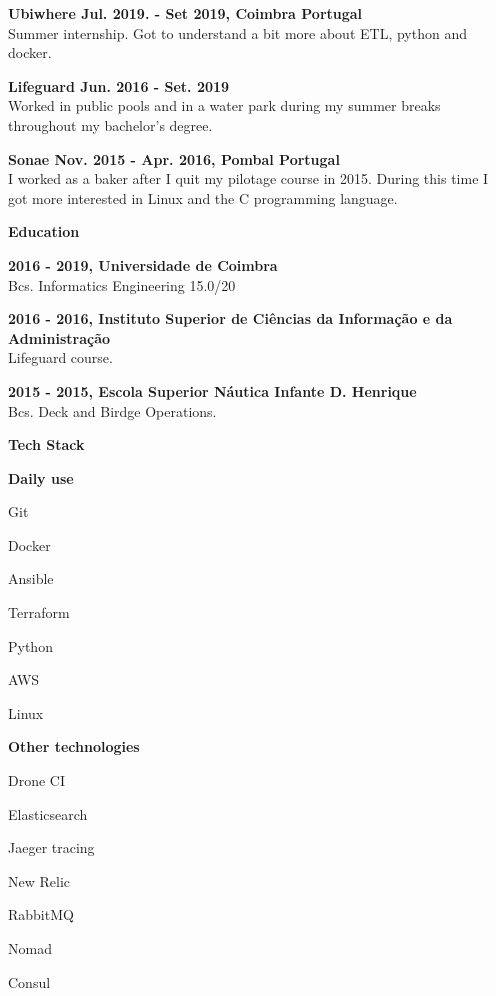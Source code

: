\documentclass[a4paper,12pt,final]{memoir}
\newcommand{\Sep}{\vspace{1.5em}}
\newcommand{\SmallSep}{\vspace{0.5em}}
\newcommand{\CVSection}[1]
	{\Large\textbf{#1}\par
	\SmallSep\normalsize\normalfont}
\newcommand{\CVItem}[1]
	{\textbf{\color{RoyalBlue} #1}}
\begin{document}
\CVItem{Ubiwhere Jul. 2019. - Set 2019, Coimbra Portugal}\\
Summer internship. Got to understand a bit more about ETL, python and docker. 
\SmallSep

\CVItem{Lifeguard Jun. 2016 - Set. 2019}\\
Worked in public pools and in a water park during my summer breaks throughout my bachelor's degree.
\SmallSep

\CVItem{Sonae Nov. 2015 - Apr. 2016, Pombal Portugal}\\
I worked as a baker after I quit my pilotage course in 2015. During this time I got more interested in Linux and the C programming language.
\SmallSep


\Sep

\CVSection{Education}
\CVItem{2016 - 2019, Universidade de Coimbra}\\
Bcs. Informatics Engineering 15.0/20
\SmallSep

\CVItem{2016 - 2016, Instituto Superior de Ciências da Informação e da Administração}\\
Lifeguard course.
\SmallSep

\CVItem{2015 - 2015, Escola Superior Náutica Infante D. Henrique
}\\
Bcs. Deck and Birdge Operations.
\SmallSep


\CVSection{Tech Stack}

\CVItem{Daily use}
\begin{multicols}{3}
\begin{compactitem}[\color{RoyalBlue}$\circ$]
	\item Git
	\item Docker
	\item Ansible
	\item Terraform
	\item Python
	\item AWS
	\item Linux
\end{compactitem}
\end{multicols}
\Sep 

\CVItem{Other technologies}
\begin{multicols}{3}
\begin{compactitem}[\color{RoyalBlue}$\circ$]
	\item Drone CI
	\item Elasticsearch
	\item Jaeger tracing
	\item New Relic
	\item RabbitMQ
	\item Nomad
	\item Consul
\end{compactitem}
\end{multicols}
\Sep 
\end{document}
